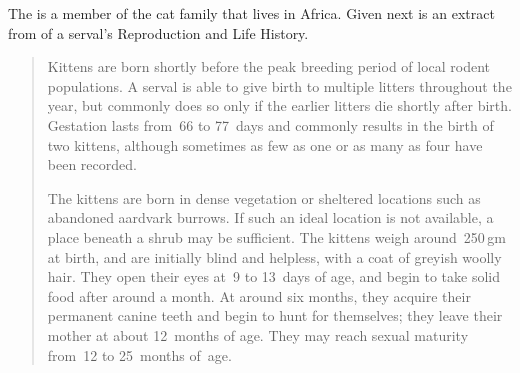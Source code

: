 \begin{example} \label{eg:serval} 
The  is a member of the cat family that lives in Africa.
Given next is an extract from  of a serval's Reproduction and Life History.
\begin{quote}
Kittens are born shortly before the peak breeding period of local rodent populations. A serval is able to give birth to multiple litters throughout the year, but commonly does so only if the earlier litters die shortly after birth. Gestation lasts from~66 to 77~days and commonly results in the birth of two kittens, although sometimes as few as one or as many as four have been recorded.

The kittens are born in dense vegetation or sheltered locations such as abandoned aardvark burrows. If such an ideal location is not available, a place beneath a shrub may be sufficient. The kittens weigh around~250\,gm at birth, and are initially blind and helpless, with a coat of greyish woolly hair. They open their eyes at~9 to 13~days of age, and begin to take solid food after around a month. At around six months, they acquire their permanent canine teeth and begin to hunt for themselves; they leave their mother at about 12~months of age. They may reach sexual maturity from~12 to 25~months of~age.


\end{quote}
\end{example}
